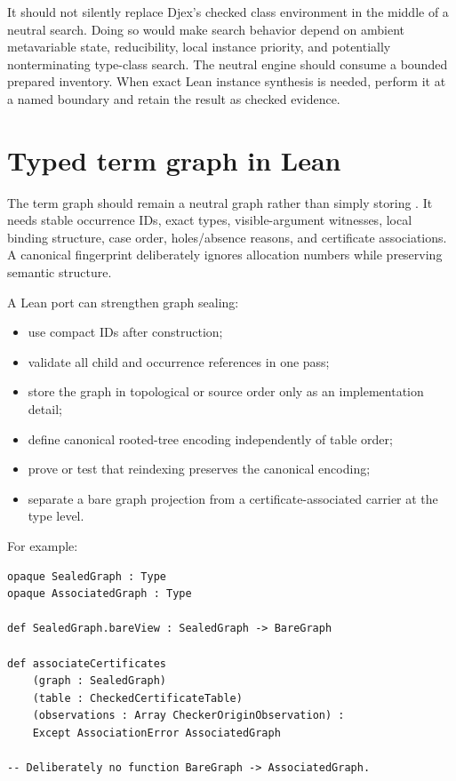 \documentclass[10pt,letterpaper,oneside]{report}
\newcommand{\code}[1]{\texttt{\detokenize{#1}}}
\begin{document}
It should not silently replace Djex's checked class environment in the middle of a neutral search. Doing so would make search behavior depend on ambient metavariable state, reducibility, local instance priority, and potentially nonterminating type-class search. The neutral engine should consume a bounded prepared inventory. When exact Lean instance synthesis is needed, perform it at a named boundary and retain the result as checked evidence.

\section{Typed term graph in Lean}

The term graph should remain a neutral graph rather than simply storing \code{Expr}. It needs stable occurrence IDs, exact types, visible-argument witnesses, local binding structure, case order, holes/absence reasons, and certificate associations. A canonical fingerprint deliberately ignores allocation numbers while preserving semantic structure.

A Lean port can strengthen graph sealing:

\begin{itemize}
  \item use compact \code{Fin nodeCount} IDs after construction;
  \item validate all child and occurrence references in one pass;
  \item store the graph in topological or source order only as an implementation detail;
  \item define canonical rooted-tree encoding independently of table order;
  \item prove or test that reindexing preserves the canonical encoding;
  \item separate a bare graph projection from a certificate-associated carrier at the type level.
\end{itemize}

For example:

\begin{lstlisting}[language=Leanish]
opaque SealedGraph : Type
opaque AssociatedGraph : Type

def SealedGraph.bareView : SealedGraph -> BareGraph

def associateCertificates
    (graph : SealedGraph)
    (table : CheckedCertificateTable)
    (observations : Array CheckerOriginObservation) :
    Except AssociationError AssociatedGraph

-- Deliberately no function BareGraph -> AssociatedGraph.
\end{lstlisting}
\end{document}
